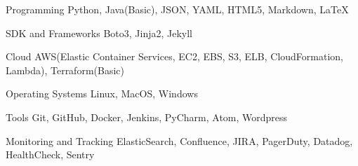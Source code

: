 

\begin{cvskills}

  \cvskill
    {Programming} %
    {Python, Java(Basic), JSON, YAML, HTML5, Markdown, LaTeX} %

  \cvskill
    {SDK and Frameworks} %
    {Boto3, Jinja2, Jekyll} %

  \cvskill
    {Cloud} %
    {AWS(Elastic Container Services, EC2, EBS, S3, ELB, CloudFormation, Lambda), Terraform(Basic)} %


  \cvskill
    {Operating Systems} %
    {Linux, MacOS, Windows} %


  \cvskill
    {Tools} %
    {Git, GitHub, Docker, Jenkins, PyCharm, Atom, Wordpress} %


  \cvskill
    {Monitoring and Tracking} %
    {ElasticSearch, Confluence, JIRA, PagerDuty, Datadog, HealthCheck, Sentry } %

\end{cvskills}
